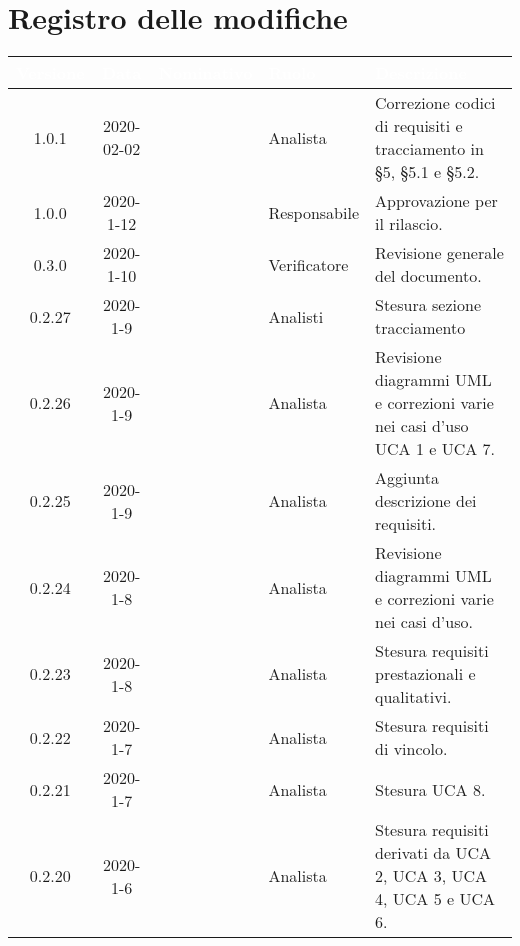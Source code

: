 \section*{Registro delle modifiche}
\setcounter{table}{-1}
{

\renewcommand{\arraystretch}{1.5}
\centering
\begin{longtable}{ c c  C{4cm}  C{3cm} C{4cm}}
   \textcolor{white}{\textbf{Versione}} &
   \textcolor{white}{\textbf{Data}}&
   \textcolor{white}{\textbf{Nominativo}}&
   \textcolor{white}{\textbf{Ruolo}}&
   \textcolor{white}{\textbf{Descrizione}}\\
   \endhead

1.0.1 & 2020-02-02 & \AT{} & Analista & Correzione codici di requisiti e tracciamento in §5, §5.1 e §5.2. \\

1.0.0 & 2020-1-12 & \AT{} & Responsabile & Approvazione per il rilascio. \\

0.3.0 & 2020-1-10 & \SE{} & Verificatore & Revisione generale del documento. \\

0.2.27 & 2020-1-9 & \CE{} \PF{} \DF{} & Analisti & Stesura sezione tracciamento \\

0.2.26 & 2020-1-9 & \PF{} & Analista & Revisione diagrammi UML e correzioni varie nei casi d'uso UCA 1 e UCA 7. \\

0.2.25 & 2020-1-9 & \CE{} & Analista & Aggiunta descrizione dei requisiti. \\

0.2.24 & 2020-1-8 & \CE{} & Analista & Revisione diagrammi UML e correzioni varie nei casi d'uso. \\

0.2.23 & 2020-1-8 & \DF{} & Analista & Stesura requisiti prestazionali e qualitativi. \\

0.2.22 & 2020-1-7 & \PF{} & Analista & Stesura requisiti di vincolo. \\

0.2.21 & 2020-1-7 & \PF{} & Analista & Stesura UCA 8. \\

0.2.20 & 2020-1-6 & \PF{} & Analista & Stesura requisiti derivati da UCA 2, UCA 3, UCA 4, UCA 5 e UCA 6. \\


\end{longtable}}
